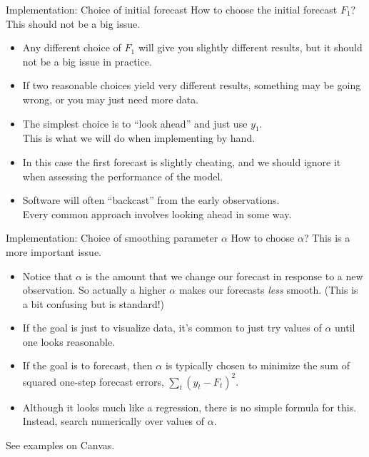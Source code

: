 \documentclass[t,12pt]{beamer}
\begin{document}
	\begin{frame}[c]{Implementation: Choice of initial forecast}
	How to choose the initial forecast $F_1$? This should not be a big issue.
	\begin{itemize}
	\medskip
	\smallskip
	\item Any different choice of $F_1$ will give you slightly different results, but it should not be a big issue in practice.
	\smallskip
	\item If two reasonable choices yield very different results, something may be going wrong, or you may just need more data.
	\item The simplest choice is to ``look ahead'' and just use $y_1$.
	\\ This is what we will do when implementing by hand.
	\smallskip
	\item In this case the first forecast is slightly cheating, and we should ignore it when assessing the performance of the model.
	\smallskip
	\item Software will often ``backcast'' from the early observations.
	\\ Every common approach involves looking ahead in some way.
	\end{itemize}
	\end{frame}

	\begin{frame}[c]{Implementation: Choice of smoothing parameter $\alpha$}
	How to choose $\alpha$? This is a more important issue.
	\begin{itemize}
	\medskip
	\item Notice that $\alpha$ is the amount that we change our forecast in response to a new observation.
	So actually a higher $\alpha$ makes our forecasts \emph{less} smooth.
	(This is a bit confusing but is standard!)
	\smallskip
	\item If the goal is just to visualize data, it's common to just try values of $\alpha$ until one looks reasonable.
	\smallskip
	\item If the goal is to forecast, then $\alpha$ is typically chosen to minimize the sum of squared one-step forecast errors,
	$
	\sum_t (y_t - F_t)^2
	$.
	\smallskip
	\item 
	Although it looks much like a regression, there is no simple formula for this.
	Instead, search numerically over values of $\alpha$.
	\end{itemize}
	\medskip
	See examples on Canvas.
	\end{frame}
\end{document}
